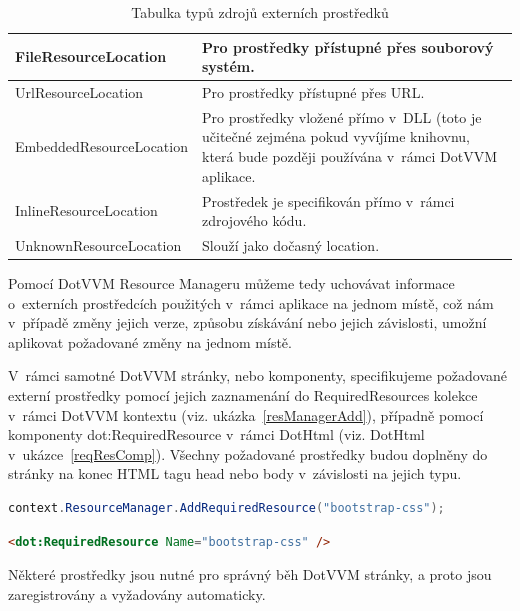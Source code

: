 \begin{table}[H]
	\caption{Tabulka typů zdrojů externích prostředků}
	\label{resLocTable}
	\centering
	\begin{tabular}{m{12em}|m{22em}}
		\toprule
FileResourceLocation           & Pro prostředky přístupné přes souborový systém. \\ \midrule
UrlResourceLocation           & Pro prostředky přístupné přes URL.\\ \midrule
EmbeddedResourceLocation           & Pro prostředky vložené přímo v~DLL (toto je učitečné zejména pokud vyvíjíme knihovnu, která bude později používána v~rámci DotVVM aplikace. \\ \midrule
InlineResourceLocation           & Prostředek je specifikován přímo v~rámci zdrojového kódu. \\ \midrule
UnknownResourceLocation           & Slouží jako dočasný location. \\
\bottomrule
\end{tabular}
\end{table}
Pomocí DotVVM Resource Manageru můžeme tedy uchovávat informace o~externích prostředcích použitých v~rámci aplikace na jednom místě, což nám v~případě změny jejich verze, způsobu získávání nebo jejich závislosti, umožní aplikovat požadované změny na jednom místě.

V~rámci samotné DotVVM stránky, nebo komponenty, specifikujeme požadované externí prostředky pomocí jejich zaznamenání do RequiredResources kolekce v~rámci DotVVM kontextu (viz. ukázka~\ref{resManagerAdd}), případně pomocí komponenty dot:RequiredResource v~rámci DotHtml (viz. DotHtml v~ukázce~\ref{reqResComp}).
Všechny požadované prostředky budou doplněny do stránky na konec HTML tagu head nebo body v~závislosti na jejich typu.

\begin{lstlisting}[language=c#, caption=Specifikace požadovaného prostředku v~rámci C# kódu,label=resManagerAdd,captionpos=t]
context.ResourceManager.AddRequiredResource("bootstrap-css");

\end{lstlisting}

\begin{lstlisting}[language=Html, caption=Specifikace požadovaného prostředku v~rámci DotHtml,label=reqResComp,captionpos=t]
<dot:RequiredResource Name="bootstrap-css" />

\end{lstlisting}
Některé prostředky jsou nutné pro správný běh DotVVM stránky, a proto jsou zaregistrovány a vyžadovány automaticky.


